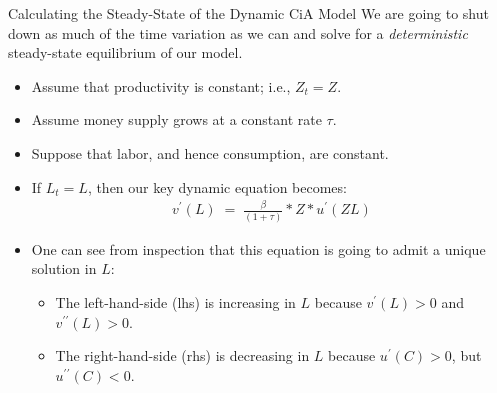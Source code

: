 \documentclass[10pt,c,aspectratio=1610,handout]{beamer}
\begin{document}
\begin{frame}{Calculating the Steady-State of the Dynamic CiA Model}%
  We are going to shut down as much of the time variation as we can and solve for a \emph{deterministic} steady-state equilibrium of our model.%
  \pause%
  \begin{itemize}%
    \item[$\blacktriangleright$] Assume that productivity is constant; i.e., $Z_{t} = Z$.%
    \item[$\blacktriangleright$] Assume money supply grows at a constant rate $\tau$.%
    \pause%
    \item[$\blacktriangleright$] Suppose that labor, and hence consumption, are constant.%
    \item[$\blacktriangleright$] If $L_{t} = L$, then our key dynamic equation becomes:%
    \begin{align*}%
      v^{\prime} (L) \; = \; \frac{\beta}{(1+\tau)} \ast Z \ast u^{\prime}(Z L)%
    \end{align*}%
    \item[$\blacktriangleright$] One can see from inspection that this equation is going to admit a unique solution in $L$:%
    \begin{itemize}%
      \item[$\rightarrow$] The left-hand-side (lhs) is increasing in $L$ because $v^{\prime}(L)>0$ and $v^{\prime \prime}(L)>0$.%
      \item[$\rightarrow$] The right-hand-side (rhs) is decreasing in $L$ because $u^{\prime}(C)>0$, but $u^{\prime\prime}(C)<0$.%
    \end{itemize}%
  \end{itemize}%
\end{frame}%
\end{document}
